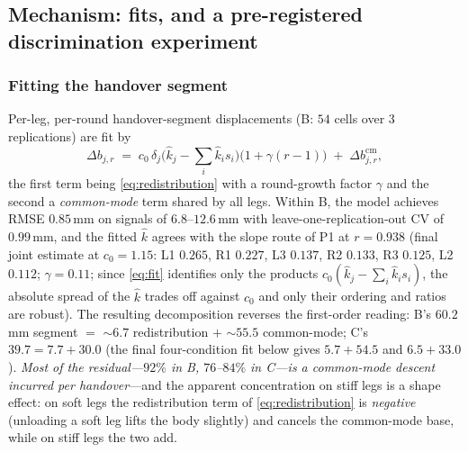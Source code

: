 \documentclass[journal]{IEEEtran}
\begin{document}
\subsection{Mechanism: fits, and a pre-registered discrimination
experiment}
\label{sec:mechanism}

\subsubsection{Fitting the handover segment}
Per-leg, per-round handover-segment displacements (B: $54$ cells over
$3$ replications) are fit by
\begin{equation}
\Delta b_{j,r} \;=\;
c_0\,\delta_j\bigl(\hat{k}_j - \textstyle\sum_i \hat{k}_i s_i\bigr)
\bigl(1+\gamma(r{-}1)\bigr) \;+\; \Delta b^{\mathrm{cm}}_{j,r},
\label{eq:fit}
\end{equation}
the first term being \eqref{eq:redistribution} with a round-growth
factor $\gamma$ and the second a \emph{common-mode} term shared by all
legs. Within B, the model achieves RMSE $0.85$\,mm on signals of
$6.8$--$12.6$\,mm with leave-one-replication-out CV of $0.99$\,mm, and
the fitted $\hat{k}$ agrees with the slope route of P1 at $r=0.938$
(final joint estimate at $c_0=1.15$: L1 $0.265$, R1 $0.227$, L3
$0.137$, R2 $0.133$, R3 $0.125$, L2 $0.112$; $\gamma=0.11$; since
\eqref{eq:fit} identifies only the products $c_0(\hat{k}_j - \sum_i
\hat{k}_i s_i)$, the absolute spread of the $\hat{k}$ trades off
against $c_0$ and only their ordering and ratios are robust). The
resulting decomposition reverses the first-order reading: B's
$60.2$\,mm segment $=$ ${\sim}6.7$ redistribution $+$ ${\sim}55.5$
common-mode; C's $39.7 = 7.7 + 30.0$ (the final four-condition fit
below gives $5.7+54.5$ and $6.5+33.0$). \emph{Most of the
residual---$92\%$ in B, $76$--$84\%$ in C---is a common-mode descent
incurred per handover}---and the apparent concentration on
stiff legs is a shape effect: on soft legs the redistribution term of
\eqref{eq:redistribution} is \emph{negative} (unloading a soft leg
lifts the body slightly) and cancels the common-mode base, while on
stiff legs the two add.
\end{document}
